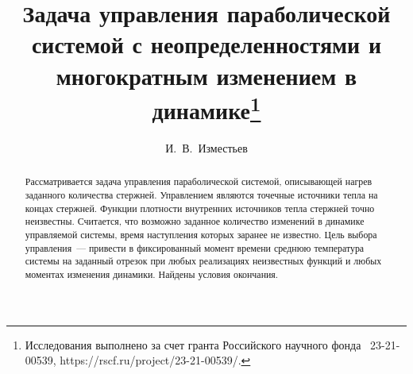\usepackage[russian]{nla}


\fi

\title{Задача управления параболической\\ системой с неопределенностями и\\ многократным изменением в 
динамике\thanks{Исследования выполнено за счет гранта Российского научного фонда \textnumero~23-21-00539, https://rscf.ru/project/23-21-00539/.}}
\author{И.~В.~Изместьев 
}


\maketitle

\begin{abstract}
Рассматривается задача управления параболической системой, описывающей нагрев заданного количества стержней. Управлением являются точечные источники тепла на концах стержней. Функции плотности внутренних источников тепла стержней точно неизвестны. Считается, что возможно заданное количество изменений в динамике управляемой системы, время наступления которых заранее не известно. Цель выбора управления~--- привести в фиксированный момент времени среднюю температура системы на заданный отрезок при любых реализациях неизвестных функций и любых моментах изменения динамики. Найдены условия окончания.

\end{abstract}

